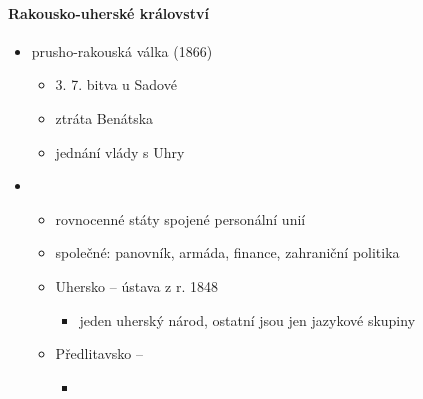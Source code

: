 \paragraph{Rakousko-uherské království}
\begin{itemize}
\item prusho-rakouská válka (1866)
	\begin{itemize}
	\item 3. 7. bitva u Sadové
	\item ztráta Benátska
	\item jednání vlády s Uhry
	\end{itemize}
	
\item {}
	\begin{itemize}
	\item rovnocenné státy spojené personální unií
	\item společné: panovník, armáda, finance, zahraniční politika
	\item Uhersko -- ústava z r. 1848
		\begin{itemize}
		\item jeden uherský národ, ostatní jsou jen jazykové skupiny
		\end{itemize}
	\item Předlitavsko -- 
		\begin{itemize}
		\item 
		\end{itemize}		 
	\end{itemize}
\end{itemize}

\newpage
\timeline


